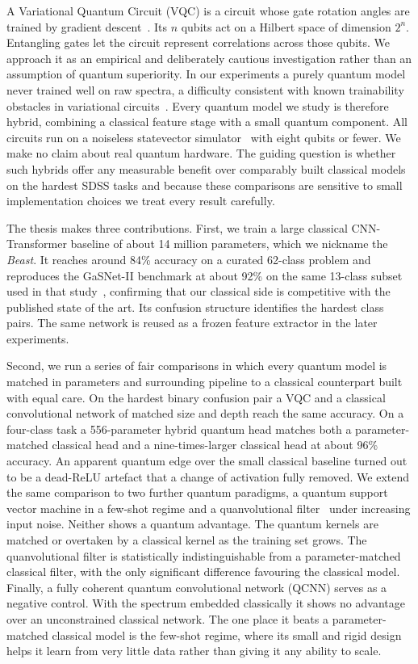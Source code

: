 A Variational Quantum Circuit (VQC) is a circuit whose gate rotation angles are
trained by gradient descent~\cite{perezsalinas2020reuploading}. Its $n$ qubits act on a
Hilbert space of dimension $2^n$. Entangling gates let the circuit represent
correlations across those qubits. We approach it as an
empirical and deliberately cautious investigation rather than an assumption of
quantum superiority. In our experiments a purely quantum model never trained well
on raw spectra, a difficulty consistent with known trainability obstacles in
variational circuits~\cite{mcclean2018barren}. Every quantum model we study is
therefore hybrid, combining a classical feature stage with a small quantum component.
All circuits run on
a noiseless statevector simulator~\cite{bergholm2018pennylane} with eight qubits or
fewer. We make no claim about real quantum hardware. The guiding question is
whether such hybrids offer any measurable benefit over comparably built classical
models on the hardest SDSS tasks and because these comparisons are sensitive to
small implementation choices we treat every result carefully.

The thesis makes three contributions. First, we train a large classical
CNN-Transformer baseline of about 14 million parameters, which we nickname the
\emph{Beast}. It reaches around 84\% accuracy on a curated 62-class problem and
reproduces the GaSNet-II benchmark at about 92\% on the same 13-class subset used in
that study~\cite{zhong2024gasnet}, confirming that our classical side is competitive
with the published state of the art. Its confusion structure identifies the hardest
class pairs. The same network is reused as a frozen feature extractor in the later
experiments.

Second, we run a series of fair comparisons in which every quantum model is matched in
parameters and surrounding pipeline to a classical counterpart built with equal care.
On the hardest binary confusion pair a VQC and a classical convolutional network of
matched size and depth reach the same accuracy. On a four-class task a 556-parameter hybrid quantum
head matches both a parameter-matched classical head and a nine-times-larger classical
head at about 96\% accuracy. An apparent quantum edge over the small classical
baseline turned out to be a dead-ReLU artefact that a change of activation fully
removed. We extend the same comparison to two further quantum paradigms, a quantum
support vector machine in a few-shot regime and a quanvolutional
filter~\cite{henderson2020quanvolutional} under increasing input noise. Neither shows a
quantum advantage. The quantum kernels are matched or overtaken by a classical kernel
as the training set grows. The quanvolutional filter is statistically
indistinguishable from a parameter-matched classical filter, with the only significant
difference favouring the classical model. Finally, a fully coherent quantum
convolutional network (QCNN) serves as a negative control. With the spectrum embedded
classically it shows no advantage over an unconstrained classical network. The one place
it beats a parameter-matched classical model is the few-shot regime, where its small and
rigid design helps it learn from very little data rather than giving it any ability to
scale.

